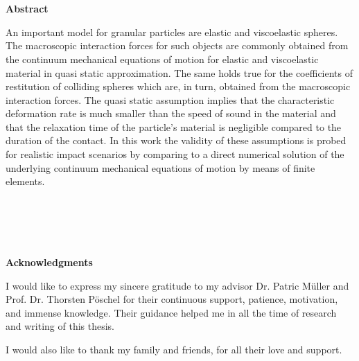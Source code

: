 %
% 

\chapter*{\ }


\vspace{0.75em}

\vspace{2em}
\begin{center}
	\begin{large}
		\textbf{Abstract}
	\end{large}
\end{center}
\vspace{0.75em}

An important model for granular particles are elastic and viscoelastic spheres. The macroscopic interaction forces for such objects are commonly obtained from the continuum mechanical equations of motion for elastic and viscoelastic material in quasi static approximation. The same holds true for the coefficients of restitution of colliding spheres which are, in turn, obtained from the macroscopic interaction forces. The quasi static assumption implies that the characteristic deformation rate is much smaller than the speed of sound in the material and that the relaxation time of the particle's material is negligible compared to the duration of the contact.  In this work the validity of these assumptions is probed for realistic impact scenarios by comparing to a direct numerical solution of the underlying continuum mechanical equations of motion by means of finite elements.   


\newpage

\chapter*{\ }


\vspace{0.75em}

\vspace{2em}
\begin{center}
	\begin{large}
		\textbf{Acknowledgments}
	\end{large}
\end{center}
\vspace{0.75em}



I would like to express my sincere gratitude to my advisor Dr. Patric Müller and Prof. Dr. Thorsten Pöschel for their continuous support, patience, motivation, and immense knowledge. Their guidance helped me in all the time of research and writing of this thesis.

I would also like to thank my family and friends, for all their love and support.